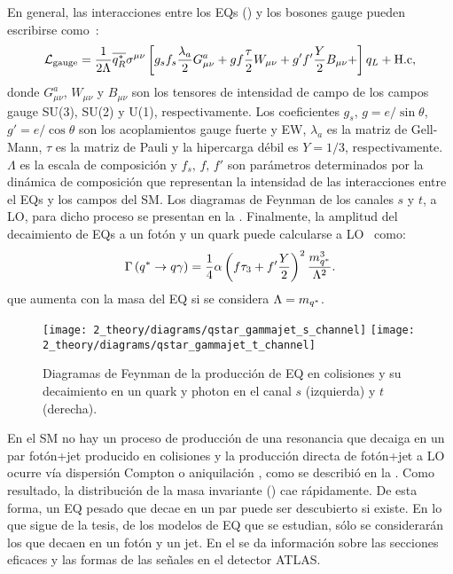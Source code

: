 En general, las interacciones entre los \acp{EQ} (\qstar) y los bosones gauge pueden escribirse como~\cite{Zhan_Li_Liu_Li-2016}:
\begin{equation}
    \mathcal{L}_{\text{gauge}} = 
    \frac{1}{2\Lambda}
    \overline{q^{*}_R}
    \sigma^{\mu\nu}
    \left[
        g_s f_s \frac{\lambda_a}{2} G_{\mu\nu}^a +
        g f \frac{\tau}{2} W_{\mu\nu} +
        g' f' \frac{Y}{2} B_{\mu\nu} +
    \right]
    q_L
    + \text{H.c},
\end{equation}
donde \(G_{\mu\nu}^a\), \(W_{\mu\nu}\) y \(B_{\mu\nu}\) son los tensores de intensidad de campo de los campos gauge SU(3), SU(2) y U(1), respectivamente. Los coeficientes \(g_s\), \(g = e / \sin \theta\), \(g' = e / \cos \theta\) son los acoplamientos gauge fuerte y \ac{EW}, \(\lambda_a\) es la matriz de Gell-Mann, \(\tau\) es la matriz de Pauli y la hipercarga débil es \(Y = 1/3\), respectivamente. \(\Lambda\) es la escala de composición y \(f_s, \, f, \, f'\) son parámetros determinados por la dinámica de composición que representan la intensidad de las interacciones entre el \acp{EQ} y los campos del \ac{SM}. Los diagramas de Feynman de los canales \(s\) y \(t\), a \ac{LO}, para dicho proceso se presentan en la \Fig{\ref{fig:theory:bsm:diagrams}}. Finalmente, la amplitud del decaimiento de \acp{EQ} a un fotón y un quark puede calcularse a \ac{LO}~\cite{Zhan_Li_Liu_Li-2016} como:
\begin{equation}
    \Gamma\left(q^{*} \rightarrow q \gamma\right) =
    \frac{1}{4}
    \alpha
    \left(f \tau_3 + f' \frac{Y}{2}\right)^2
    \frac{m_{q^*}^3}{\Lambda^2}.
\end{equation}
que aumenta con la masa \mq del \ac{EQ} si se considera \(\Lambda = m_{q^*}\).


\begin{figure}[ht!]
    \centering
    \texttt{[image: 2\_theory/diagrams/qstar\_gammajet\_s\_channel]}
    \hspace{1cm}
    \texttt{[image: 2\_theory/diagrams/qstar\_gammajet\_t\_channel]}
    \caption{Diagramas de Feynman de la producción de \ac{EQ} en colisiones \pp y su decaimiento en un quark y photon en el canal \(s\) (izquierda) y \(t\) (derecha).}
    \label{fig:theory:bsm:diagrams}
\end{figure}


En el \ac{SM} no hay un proceso de producción de una resonancia que decaiga en un par fotón+jet producido en colisiones \pp y la producción directa de fotón+jet a \ac{LO} ocurre vía dispersión Compton o aniquilación \qqbar, como se describió en la \Sect{\ref{subsec:theory:sm:prompt_photon}}. Como resultado, la distribución de la masa invariante \gammajet (\myj) cae rápidamente. De esta forma, un \ac{EQ} pesado que decae en un par \gammajet puede ser descubierto si existe. En lo que sigue de la tesis, de los modelos de \ac{EQ} que se estudian, sólo se considerarán los que decaen en un fotón y un jet. En el \Ch{\ref{ch:samples}} se da información sobre las secciones eficaces y las formas de las señales en el detector \ac{ATLAS}.

